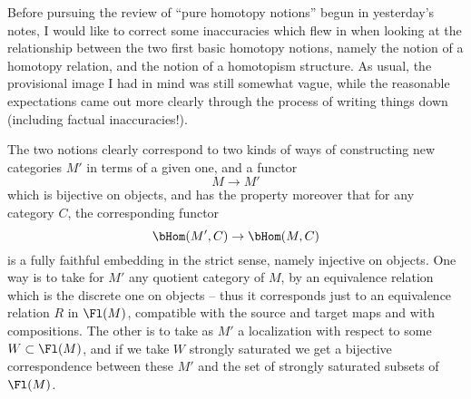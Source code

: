 \bigbreak
\presectionfill{}\par

\label{sec:52}%
Before pursuing the review of ``pure homotopy notions'' begun in
yesterday's notes, I would like to correct some inaccuracies which
flew in when looking at the relationship between the two first basic
homotopy notions, namely the notion of a homotopy relation, and the
notion of a homotopism structure. As usual, the provisional image I
had in mind was still somewhat vague, while the reasonable
expectations came out more clearly through the process of writing
things down (including factual inaccuracies!).

The two notions clearly correspond to two kinds of ways of
constructing new categories $M'$ in terms of a given one, and a
functor
\[ M \to M'\]
which is bijective on objects, and has the property moreover that for
any category $C$, the corresponding functor
\[\bHom(M',C) \to \bHom(M,C)\]
is a fully faithful embedding in the strict sense, namely injective
on objects. One way is to take for $M'$ any quotient
category of $M$, by an equivalence relation which is the discrete one
on objects -- thus it corresponds just to an equivalence relation $R$
in $\Fl(M)$, compatible with the source and target maps and with
compositions. The other is to take as $M'$ a localization with respect
to some $W\subset\Fl(M)$, and if we take $W$ strongly saturated we get
a bijective correspondence between these $M'$ and the set of strongly
saturated subsets of $\Fl(M)$.


